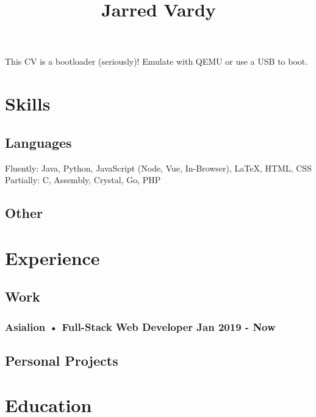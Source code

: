 \documentclass[12pt,a4paper]{article}
\begin{document}
%
\title{Jarred Vardy}
\maketitle
This CV is a bootloader (seriously)! Emulate with QEMU or use a USB to boot.


%
\section{Skills}
\subsection{Languages}
Fluently: Java, Python, JavaScript (Node, Vue, In-Browser), LaTeX, HTML, CSS\\
Partially: C, Assembly, Crystal, Go, PHP

\subsection{Other}

%
\section{Experience}
\subsection{Work}

\subsubsection{Asialion • Full-Stack Web Developer Jan 2019 - Now}

%
\subsection{Personal Projects}

\section{Education}
\end{document}
